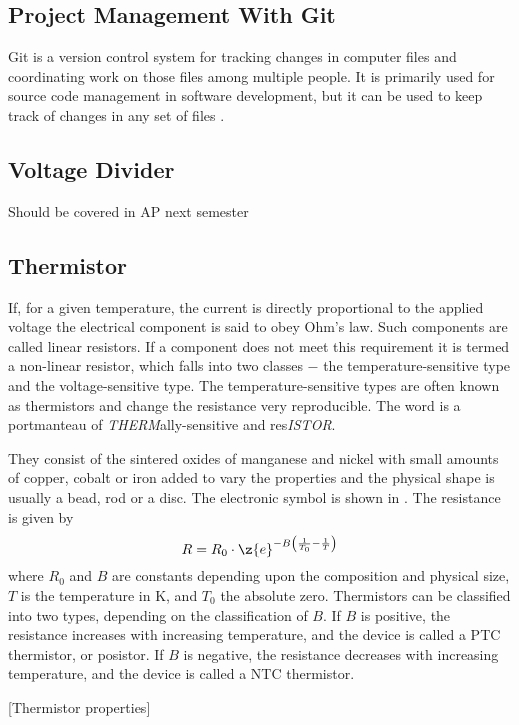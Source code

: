\subsection{Project Management With Git}
\noindent
Git is a version control system for tracking changes in computer files and coordinating work on those files among multiple people. It is primarily used for source code management in software development, but it can be used to keep track of changes in any set of files \cite{wiki:2}.

\subsection{Voltage Divider}
Should be covered in AP next semester

\subsection{Thermistor}
If, for a given temperature, the current is directly proportional to the applied voltage the electrical component is said to obey Ohm's law. Such components are called linear resistors. If a component does not meet this requirement it is termed a non-linear resistor, which falls into two classes $-$ the temperature-sensitive type and the voltage-sensitive type. The temperature-sensitive types are often known as thermistors and change the resistance very reproducible. The word is a portmanteau of \textit{THERM}ally-sensitive and res\textit{ISTOR}.\par
They consist of the sintered oxides of manganese and nickel with small amounts of copper, cobalt or iron added to vary the properties and the physical shape is usually a bead, rod or a disc. The electronic symbol is shown in . The resistance is given by
\begin{equation}
	R = R_{0}\cdot\z{e}^{-B\left(\frac{1}{T_{0}} - \frac{1}{T}\right)}
\end{equation}
where $R_{0}$ and $B$ are constants depending upon the composition and physical size, $T$ is the temperature in \deg K, and $T_{0}$ the absolute zero. Thermistors can be classified into two types, depending on the classification of $B$. If $B$ is positive, the resistance increases with increasing temperature, and the device is called a \ac{PTC} thermistor, or posistor. If $B$ is negative, the resistance decreases with increasing temperature, and the device is called a \ac{NTC} thermistor.

[Thermistor properties]

